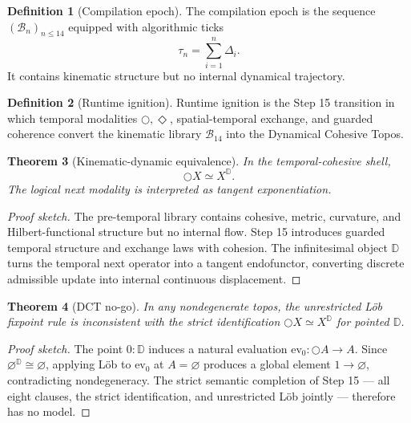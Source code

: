 \documentclass[11pt]{article}
\theoremstyle{plain}
\newtheorem{theorem}{Theorem}[section]
\theoremstyle{definition}
\newtheorem{definition}[theorem]{Definition}
\theoremstyle{remark}
\newenvironment{proofsketch}{\begin{proof}[Proof sketch]}{\end{proof}}
\newcommand{\B}{\mathcal{B}}
\newcommand{\Next}{\bigcirc}
\newcommand{\Eventually}{\Diamond}
\newcommand{\D}{\mathbb{D}}
\begin{document}
\begin{definition}[Compilation epoch]
The compilation epoch is the sequence \((\B_n)_{n\le14}\) equipped with algorithmic ticks
\[
\tau_n=\sum_{i=1}^{n}\Delta_i.
\]
It contains kinematic structure but no internal dynamical trajectory.
\end{definition}

\begin{definition}[Runtime ignition]
Runtime ignition is the Step 15 transition in which temporal modalities \(\Next,\Eventually\), spatial-temporal exchange, and guarded coherence convert the kinematic library \(\B_{14}\) into the Dynamical Cohesive Topos.
\end{definition}

\begin{theorem}[Kinematic-dynamic equivalence]
In the temporal-cohesive shell,
\[
\Next X\simeq X^{\D}.
\]
The logical next modality is interpreted as tangent exponentiation.
\end{theorem}

\begin{proofsketch}
The pre-temporal library contains cohesive, metric, curvature, and Hilbert-functional structure but no internal flow. Step 15 introduces guarded temporal structure and exchange laws with cohesion. The infinitesimal object \(\D\) turns the temporal next operator into a tangent endofunctor, converting discrete admissible update into internal continuous displacement.
\end{proofsketch}

\begin{theorem}[DCT no-go]
In any nondegenerate topos, the unrestricted L\"ob fixpoint rule is inconsistent with the strict identification \(\Next X\simeq X^{\D}\) for pointed \(\D\).
\end{theorem}

\begin{proofsketch}
The point \(0:\D\) induces a natural evaluation \(\mathrm{ev}_0:\Next A\to A\). Since \(\varnothing^{\D}\cong\varnothing\), applying L\"ob to \(\mathrm{ev}_0\) at \(A=\varnothing\) produces a global element \(1\to\varnothing\), contradicting nondegeneracy. The strict semantic completion of Step 15 --- all eight clauses, the strict identification, and unrestricted L\"ob jointly --- therefore has no model.
\end{proofsketch}
\end{document}
